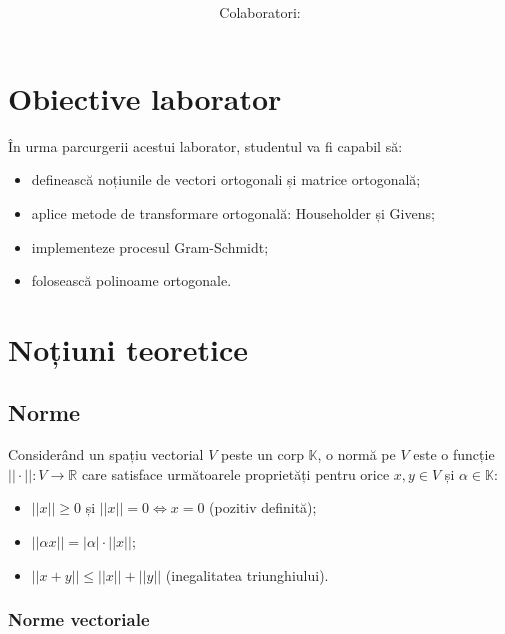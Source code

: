 \documentclass{exam}
\title{
\textmd{\textbf{\MNLabTitle}}
\author{Colaboratori: \MNAuthor}
}
\begin{document}
\begin{coverpages}

	\maketitle
	\tableofcontents

\end{coverpages}

\section{Obiective laborator}

\par În urma parcurgerii acestui laborator, studentul va fi capabil să:
\begin{itemize}
	\item definească noțiunile de vectori ortogonali și matrice ortogonală;
	\item aplice metode de transformare ortogonală: Householder și Givens;
	\item implementeze procesul Gram-Schmidt;
	\item folosească polinoame ortogonale.
\end{itemize}

\section{Noțiuni teoretice}

\subsection{Norme}

\par Considerând un spațiu vectorial $V$ peste un corp $\mathbb{K}$, o normă pe
$V$ este o funcție $||\cdot||: V \rightarrow \mathbb{R}$ care satisface
următoarele proprietăți pentru orice $x, y \in V$ și $\alpha \in \mathbb{K}$:

\begin{itemize}
	\item $||x|| \geq 0$ și $||x|| = 0 \Leftrightarrow x = 0$ (pozitiv definită);
	\item $||\alpha x|| = |\alpha| \cdot ||x||$;
	\item $||x + y|| \leq ||x|| + ||y||$ (inegalitatea triunghiului).
\end{itemize}

\subsubsection{Norme vectoriale}
\end{document}
